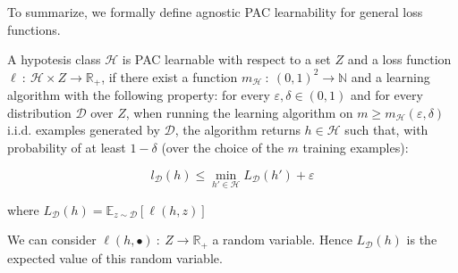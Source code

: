 \documentclass[../../main/main.tex]{subfiles}
\begin{document}
To summarize, we formally define agnostic PAC learnability for general loss functions.

\begin{definition}
    A hypotesis class \( \mathcal{H} \) is PAC learnable with respect to a set \( Z \) and a loss function \( \ell \ : \ \mathcal{H} \times Z \to \mathbb{R}_{+} \), if there exist a function \( m_{\mathcal{H}} \ : \ (0,1)^2 \to \mathbb{N} \) and a learning algorithm with the following property:
    for every \( \varepsilon, \delta \in (0,1) \) and for every distribution \( \mathcal{D} \) over \( Z \), when running the learning algorithm on \( m \ge m_{\mathcal{H}}(\varepsilon, \delta) \) i.i.d. examples generated by \( \mathcal{D} \), the algorithm returns \( h \in \mathcal{H} \) such that, with probability of at least \( 1 - \delta \) (over the choice of the \( m \) training examples):

    \begin{equation}
        l_{\mathcal{D}}(h)
        \le
        \underset{h' \in \mathcal{H}}{\min{}} L_{\mathcal{D}}(h') + \varepsilon
        \label{eq:C2_APLG}
    \end{equation}

    where \( L_{\mathcal{D}}(h) = \mathbb{E}_{z \sim \mathcal{D}}[\ell (h,z)] \)
\end{definition}

\begin{remark}
    We can consider \( \ell (h,\bullet) \ : \ Z \to \mathbb{R}_{+} \) a random variable. Hence \( L_{\mathcal{D}}(h) \) is the expected value of this random variable.
\end{remark}
\end{document}

